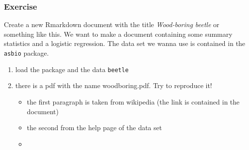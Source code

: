 \begin{frame}[fragile]\frametitle{Exercise}
  Create a new Rmarkdown document with the title \emph{Wood-boring beetle} or something like this. We want to make a document containing some summary statistics and a logistic regression. The data set we wanna use is contained in the \texttt{asbio} package.
  \begin{enumerate}
  \item load the package and the data \texttt{beetle}
  \item there is a pdf with the name woodboring.pdf. Try to reproduce it!
    \begin{itemize}
    \item the first paragraph is taken from wikipedia (the link is contained in the document)
    \item the second from the help page of the data set
    \item 
    \end{itemize}
  \end{enumerate}
\end{frame}


